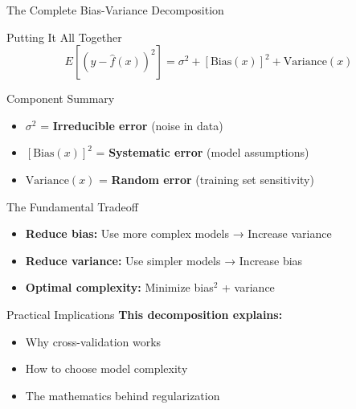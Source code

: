 \documentclass[10pt]{beamer}
\begin{document}
\begin{frame}{The Complete Bias-Variance Decomposition}
\begin{alertbox}{Putting It All Together}
$$E[(y - \hat{f}(x))^2] = \sigma^2 + [\text{Bias}(x)]^2 + \text{Variance}(x)$$
\end{alertbox}

\begin{definitionbox}{Component Summary}
\begin{itemize}
\item $\sigma^2$ = \textbf{Irreducible error} (noise in data)
\item $[\text{Bias}(x)]^2$ = \textbf{Systematic error} (model assumptions)
\item $\text{Variance}(x)$ = \textbf{Random error} (training set sensitivity)
\end{itemize}
\end{definitionbox}

\begin{keypointsbox}{The Fundamental Tradeoff}
\begin{itemize}
\item \textbf{Reduce bias:} Use more complex models → Increase variance
\item \textbf{Reduce variance:} Use simpler models → Increase bias
\item \textbf{Optimal complexity:} Minimize bias$^2$ + variance
\end{itemize}
\end{keypointsbox}

\begin{examplebox}{Practical Implications}
\textbf{This decomposition explains:}
\begin{itemize}
\item Why cross-validation works
\item How to choose model complexity
\item The mathematics behind regularization
\end{itemize}
\end{examplebox}
\end{frame}
\end{document}
